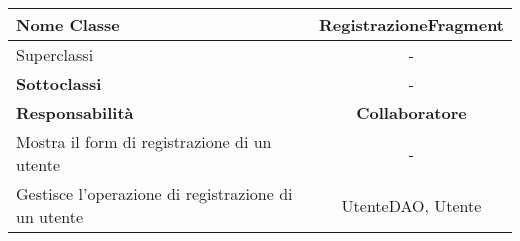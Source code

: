 
\setcounter{table}{0}
\begin{table}[H]
    \centering
    \begin{tabular}{||   l  ||  c   ||}
        \hline
        \rowcolor{Gray}
        \textbf{Nome Classe} & RegistrazioneFragment\\
        \hline
        Superclassi  &  - \\
        \hline
        \textbf{Sottoclassi} & - \\
        \hline
         \textbf{Responsabilità} & \textbf{Collaboratore} \\
         \hline
          Mostra il form di registrazione di un utente & - \\
         \hline
          Gestisce l'operazione di registrazione di un utente & UtenteDAO, Utente \\
         \hline
    \end{tabular}
\end{table}
